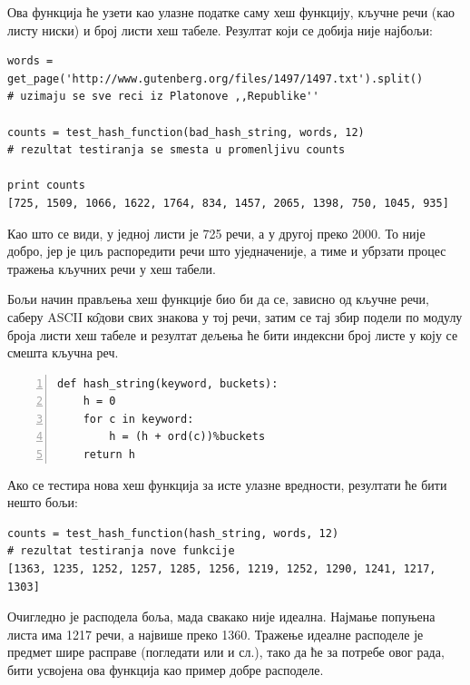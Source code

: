 Ова функција ће узети као улазне податке саму хеш функцију, кључне речи (као листу ниски) и број листи хеш табеле. Резултат који се добија није најбољи:

\begin{lstlisting}[caption = Резултат тестирања лоше hash функције, label={lst:resultstest}]
words = get_page('http://www.gutenberg.org/files/1497/1497.txt').split()
# uzimaju se sve reci iz Platonove ,,Republike''

counts = test_hash_function(bad_hash_string, words, 12)
# rezultat testiranja se smesta u promenljivu counts

print counts
[725, 1509, 1066, 1622, 1764, 834, 1457, 2065, 1398, 750, 1045, 935]
\end{lstlisting}

Као што се види, у једној листи је 725 речи, а у другој преко 2000. То није добро, јер је циљ распоредити речи што уједначеније, а тиме и убрзати процес тражења кључних речи у хеш табели.

Бољи начин прављења хеш функције био би да се, зависно од кључне речи, саберу ASCII к\^{о}дови свих знакова у тој речи, затим се тај збир подели по модулу броја листи хеш табеле и резултат дељења ће бити индексни број листе у коју се смешта кључна реч.

\begin{lstlisting}[caption=Боља хеш функција, label={lst:betterhash}, numbers = left]
def hash_string(keyword, buckets):
    h = 0
    for c in keyword:
        h = (h + ord(c))%buckets
    return h
\end{lstlisting}

Ако се тестира нова хеш функција за исте улазне вредности, резултати ће бити нешто бољи:

\begin{lstlisting}[caption = Тестирање боље хеш функције,label={lst:betterhashtest}]
counts = test_hash_function(hash_string, words, 12)
# rezultat testiranja nove funkcije
[1363, 1235, 1252, 1257, 1285, 1256, 1219, 1252, 1290, 1241, 1217, 1303]
\end{lstlisting}

Очигледно је расподела боља, мада свакако није идеална. Најмање попуњена листа има 1217 речи, а највише преко 1360. Тражење идеалне расподеле је предмет шире расправе (погледати \cite[поглавље~6.4]{Knuth1998ACP} \cite[поглавље~3]{cormen2001introduction} или \cite{artofhashing} и сл.), тако да ће за потребе овог рада, бити усвојена ова функција као пример добре расподеле.


